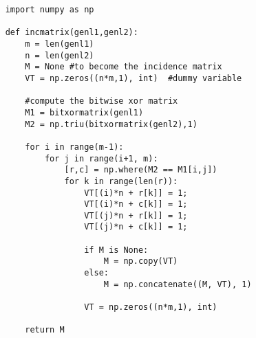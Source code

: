 \begin{verbatim}
    import numpy as np
        
    def incmatrix(genl1,genl2):
        m = len(genl1)
        n = len(genl2)
        M = None #to become the incidence matrix
        VT = np.zeros((n*m,1), int)  #dummy variable
        
        #compute the bitwise xor matrix
        M1 = bitxormatrix(genl1)
        M2 = np.triu(bitxormatrix(genl2),1) 
    
        for i in range(m-1):
            for j in range(i+1, m):
                [r,c] = np.where(M2 == M1[i,j])
                for k in range(len(r)):
                    VT[(i)*n + r[k]] = 1;
                    VT[(i)*n + c[k]] = 1;
                    VT[(j)*n + r[k]] = 1;
                    VT[(j)*n + c[k]] = 1;
                    
                    if M is None:
                        M = np.copy(VT)
                    else:
                        M = np.concatenate((M, VT), 1)
                    
                    VT = np.zeros((n*m,1), int)
        
        return M
    \end{verbatim}